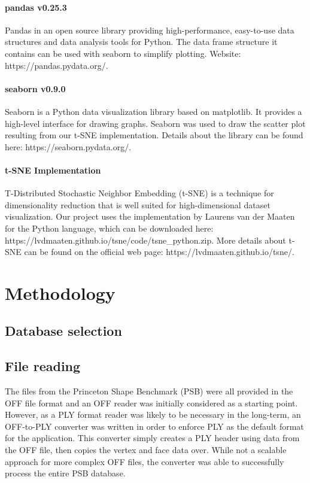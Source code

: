\documentclass{bigdata}
\begin{document}
\paragraph{pandas v0.25.3}
Pandas in an open source library providing high-performance, easy-to-use data structures and data analysis tools for Python. The data frame structure it contains can be used with seaborn to simplify plotting. Website: https://pandas.pydata.org/.
\paragraph{seaborn v0.9.0}
Seaborn is a Python data visualization library based on matplotlib. It provides a high-level interface for drawing graphs. Seaborn was used to draw the scatter plot resulting from our t-SNE implementation. Details about the library can be found here: https://seaborn.pydata.org/.
\paragraph{t-SNE Implementation}
T-Distributed Stochastic Neighbor Embedding (t-SNE) is a technique for dimensionality reduction that is well suited for high-dimensional dataset visualization. Our project uses the implementation by Laurens van der Maaten for the Python language, which can be downloaded here: https://lvdmaaten.github.io/tsne/code/tsne\_python.zip. More details about t-SNE can be found on the official web page: https://lvdmaaten.github.io/tsne/.

\section{Methodology}

\subsection{Database selection}

\subsection{File reading}

The files from the Princeton Shape Benchmark (PSB) were all provided in the OFF file format and an OFF reader was initially considered as a starting point. However, as a PLY format reader was likely to be necessary in the long-term, an OFF-to-PLY converter was written in order to enforce PLY as the default format for the application.
This converter simply creates a PLY header using data from the OFF file, then copies the vertex and face data over. While not a scalable approach for more complex OFF files, the converter was able to successfully process the entire PSB database.
\end{document}
